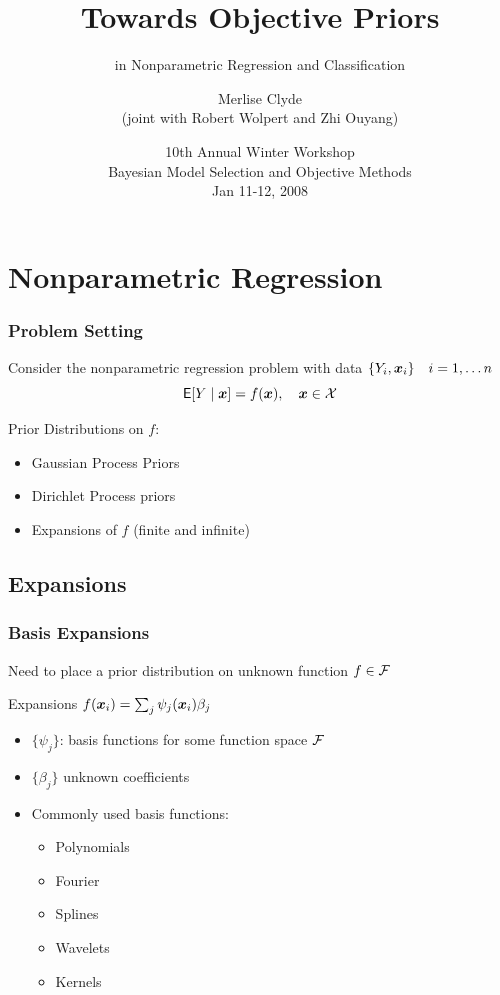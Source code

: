 \documentclass[dvips]{beamer}
\title{Towards Objective Priors}
\subtitle{\Large in Nonparametric Regression and Classification}
\author[M. Clyde]{Merlise Clyde \\ (joint with Robert Wolpert and Zhi Ouyang)}
\institute{Department of Statistical Science \\ Duke
University }
\date{10th Annual Winter Workshop  \\ Bayesian Model Selection and
  Objective Methods \\Jan 11-12, 2008}
\newcommand{\bs}[2]{\begin{frame} \frametitle{#1} 
{#2}
\end{frame} }
\begin{document}
\begin{frame}
  \titlepage
\end{frame}


\section{Nonparametric Regression}
\bs{Problem Setting}{
Consider the nonparametric regression problem with
data $\{Y_i, \bm x_i\} \quad i = 1, \dots n $
$$ {\sf{E}}[Y \mid \bm x] = f(\bm x), \quad \bm x \in \mathcal{X}$$


Prior Distributions on $f$:

\begin{itemize}
\item  Gaussian Process Priors
\item  Dirichlet Process priors
\item  Expansions of $f$  (finite and infinite)
\end{itemize}

}

\subsection{Expansions}
\bs{Basis Expansions} {
Need to place a prior distribution  on unknown function $f \in \mathcal{F}$

Expansions $f(\bm x_i) = \sum_j  \psi_j(\bm x_i)\beta_j$
 
  \begin{itemize}
   \item  $\{\psi_j\}$: basis functions for some
     function space $\mathcal{F}$ %
   \item  $\{\beta_j\}$  unknown coefficients
   \item Commonly used basis functions:
 \begin{itemize}
 \item Polynomials
 \item Fourier 
 \item Splines 
 \item Wavelets 
 \item Kernels 
 \end{itemize} 
   \end{itemize}

}
\end{document}
